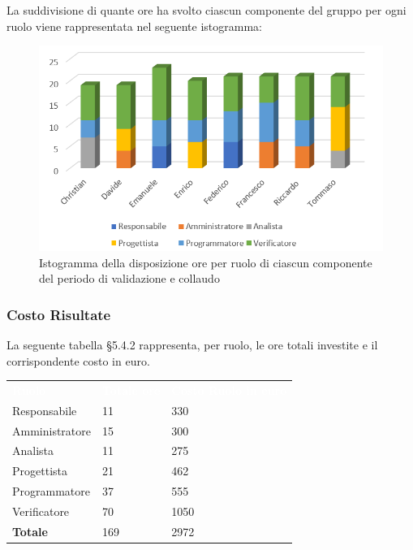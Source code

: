 La suddivisione di quante ore ha svolto ciascun componente del gruppo per ogni ruolo viene rappresentata nel seguente istogramma:

\begin{figure}[h]
	\centering
	\includegraphics[scale=2.5]{sezioni/Istogrammi/IstogrammaValidazione.png}
	\caption{Istogramma della disposizione ore per ruolo di ciascun componente del periodo di validazione e collaudo}
\end{figure}

\subsubsection{Costo Risultate}
La seguente tabella §5.4.2 rappresenta, per ruolo, le ore totali investite e il corrispondente costo in euro.
{
	\renewcommand{\arraystretch}{2}
	\centering
	\begin{longtable}{ C{3cm} C{2cm} C{4cm}}
		\textcolor{white}{\textbf{Ruolo}} & \textcolor{white}{\textbf{Totale ore}} & \textcolor{white}{\textbf{Costo Ruolo in euro}}\\	
        
        Responsabile & 11 & 330\\
        Amministratore & 15 & 300 \\
        Analista & 11 & 275\\
        Progettista & 21 & 462\\
        Programmatore & 37 & 555\\
        Verificatore & 70 & 1050\\
        \textbf{Totale} & 169 & 2972\
		
	\end{longtable}
}

